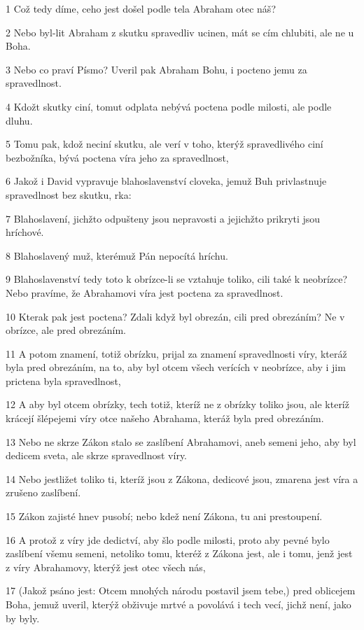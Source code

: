 \par 1 Což tedy díme, ceho jest došel podle tela Abraham otec náš?
\par 2 Nebo byl-lit Abraham z skutku spravedliv ucinen, mát se cím chlubiti, ale ne u Boha.
\par 3 Nebo co praví Písmo? Uveril pak Abraham Bohu, i pocteno jemu za spravedlnost.
\par 4 Kdožt skutky ciní, tomut odplata nebývá poctena podle milosti, ale podle dluhu.
\par 5 Tomu pak, kdož neciní skutku, ale verí v toho, kterýž spravedlivého ciní bezbožníka, bývá poctena víra jeho za spravedlnost,
\par 6 Jakož i David vypravuje blahoslavenství cloveka, jemuž Buh privlastnuje spravedlnost bez skutku, rka:
\par 7 Blahoslavení, jichžto odpušteny jsou nepravosti a jejichžto prikryti jsou hríchové.
\par 8 Blahoslavený muž, kterémuž Pán nepocítá hríchu.
\par 9 Blahoslavenství tedy toto k obrízce-li se vztahuje toliko, cili také k neobrízce? Nebo pravíme, že Abrahamovi víra jest poctena za spravedlnost.
\par 10 Kterak pak jest poctena? Zdali když byl obrezán, cili pred obrezáním? Ne v obrízce, ale pred obrezáním.
\par 11 A potom znamení, totiž obrízku, prijal za znamení spravedlnosti víry, kteráž byla pred obrezáním, na to, aby byl otcem všech verících v neobrízce, aby i jim prictena byla spravedlnost,
\par 12 A aby byl otcem obrízky, tech totiž, kteríž ne z obrízky toliko jsou, ale kteríž krácejí šlépejemi víry otce našeho Abrahama, kteráž byla pred obrezáním.
\par 13 Nebo ne skrze Zákon stalo se zaslíbení Abrahamovi, aneb semeni jeho, aby byl dedicem sveta, ale skrze spravedlnost víry.
\par 14 Nebo jestližet toliko ti, kteríž jsou z Zákona, dedicové jsou, zmarena jest víra a zrušeno zaslíbení.
\par 15 Zákon zajisté hnev pusobí; nebo kdež není Zákona, tu ani prestoupení.
\par 16 A protož z víry jde dedictví, aby šlo podle milosti, proto aby pevné bylo zaslíbení všemu semeni, netoliko tomu, kteréž z Zákona jest, ale i tomu, jenž jest z víry Abrahamovy, kterýž jest otec všech nás,
\par 17 (Jakož psáno jest: Otcem mnohých národu postavil jsem tebe,) pred oblicejem Boha, jemuž uveril, kterýž obživuje mrtvé a povolává i tech vecí, jichž není, jako by byly.
